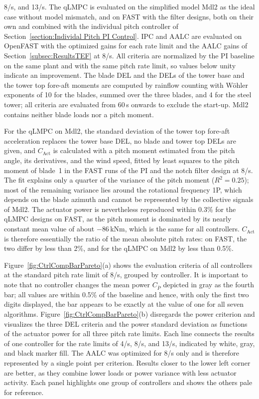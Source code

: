 8\textdegree/s, and 13\textdegree/s. The qLMPC is evaluated on the simplified model Mdl2 as the
ideal case without model mismatch, and on FAST with the filter designs, both on their own
and combined with the individual pitch controller of Section~\ref{section:Individal Pitch PI Control}.
IPC and AALC are evaluated on OpenFAST with the optimized gains for each rate limit and the
AALC gains of Section~\ref{subsec:ResultsTEF} at 8\textdegree/s. All criteria are normalized by the
PI baseline on the same plant and with the same pitch rate limit, so values below unity
indicate an improvement. The blade DEL and the DELs of the tower base and the tower top fore-aft moments are computed by
rainflow counting with W\"ohler exponents of 10 for the blades, summed over the three blades, and
4 for the steel tower; all criteria are evaluated from 60\,s onwards to exclude the start-up. Mdl2 contains neither blade loads nor a pitch moment.


For the qLMPC on Mdl2, the standard deviation of the
tower top fore-aft acceleration replaces the tower base DEL, no blade and tower top DELs are given, and $C_\text{Act}$ is calculated with a pitch moment estimated from the pitch angle, its derivatives, and the wind speed, fitted by least squares to the pitch moment of blade~1 in the FAST runs of the PI and the notch filter design at 8\textdegree/s. The fit explains only a quarter of the variance of the pitch moment ($R^2 = 0.25$); most of the remaining variance lies around the rotational frequency 1P, which depends on the blade azimuth and cannot be represented by the collective signals of Mdl2. The actuator power is nevertheless reproduced within 0.3\% for the qLMPC designs on FAST, as the pitch moment is dominated by its nearly constant mean value of about $-86$\,kNm, which is the same for all controllers. $C_\text{Act}$ is therefore essentially the ratio of the mean absolute pitch rates: on FAST, the two differ by less than 2\%, and for the qLMPC on Mdl2 by less than 0.5\%.

Figure~\ref{fig:CtrlCompBarPareto}(a) shows the evaluation criteria of all controllers at the standard
pitch rate limit of 8\textdegree/s, grouped by controller. It is important to note that no controller changes the mean power
$C_{\bar{P}}$ depicted in gray as the fourth bar; all values are within 0.5\% of the baseline and hence, with only the first two digits displayed, the bar appears to be exactly at the value of one for all seven algorithms. Figure~\ref{fig:CtrlCompBarPareto}(b) disregards the power criterion and visualizes the three DEL criteria and the power standard deviation as functions of the actuator power for all three pitch rate limits. Each line connects the
results of one controller for the rate limits of 4\textdegree/s, 8\textdegree/s, and 13\textdegree/s,
indicated by white, gray, and black marker fill. The AALC was optimized for 8\textdegree/s only and
is therefore represented by a single point per criterion. Results closer to the lower left corner
are better, as they combine lower loads or power variance with less actuator activity. Each panel
highlights one group of controllers and shows the others pale for reference.

